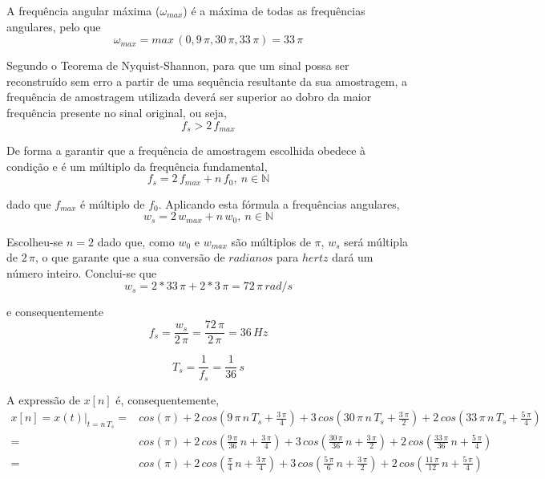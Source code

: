 \documentclass[a4paper]{article}
\begin{document}
\noindent A frequência angular máxima ($\omega_{max}$) é a máxima de todas as frequências angulares, pelo que
\begin{equation}
	\omega_{max} = max \, (0, 9 \, \pi, 30 \, \pi, 33 \, \pi) = 33 \, \pi
\end{equation}

\noindent Segundo o Teorema de Nyquist-Shannon, para que um sinal possa ser reconstruído sem erro a partir de uma sequência resultante da sua amostragem, a frequência de amostragem utilizada deverá ser superior ao dobro da maior frequência presente no sinal original, ou seja,
\begin{equation}
	f_s > 2 \, f_{max}
\end{equation}

\noindent De forma a garantir que a frequência de amostragem escolhida obedece à condição e é um múltiplo da frequência fundamental,
\begin{equation}
	f_s = 2 \, f_{max} + n \, f_0, ~ n \in \mathbb{N}
\end{equation}

\noindent dado que $f_{max}$ é múltiplo de $f_0$. Aplicando esta fórmula a frequências angulares,
\begin{equation}
	w_s = 2 \, w_{max} + n \, w_0, ~ n \in \mathbb{N}
\end{equation}

\noindent Escolheu-se $n = 2$ dado que, como $w_0$ e $w_{max}$ são múltiplos de $\pi$, $w_s$ será múltipla de $2 \, \pi$, o que garante que a sua conversão de $radianos$ para $hertz$ dará um número inteiro. Conclui-se que
\begin{equation}
	w_s = 2 * 33 \, \pi + 2 * 3 \, \pi = 72 \, \pi \, rad/s
\end{equation}

\noindent e consequentemente
\begin{equation}
	f_s = \frac{w_s}{2 \, \pi} = \frac{72 \, \pi}{2 \, \pi} = 36 \, Hz
\end{equation}

\begin{equation}
	T_s = \frac{1}{f_s} = \frac{1}{36} \, s
\end{equation}

\noindent A expressão de $x[n]$ é, consequentemente,
\begin{eqnarray}
	x[n] = x(t)|_{t = n \, T_s} = & cos(\pi) + 2 \, cos\left( 9 \, \pi \, n \, T_s + \frac{3 \, \pi}{4} \right) + 3 \, cos\left( 30 \, \pi \, n \, T_s + \frac{3 \, \pi}{2} \right) + 2 \, cos\left( 33 \, \pi \, n \, T_s + \frac{5 \, \pi}{4} \right) \\
	= & cos(\pi) + 2 \, cos\left( \frac{9 \, \pi}{36} \, n + \frac{3 \, \pi}{4} \right) + 3 \, cos\left( \frac{30 \, \pi}{36} \, n + \frac{3 \, \pi}{2} \right) + 2 \, cos\left( \frac{33 \, \pi}{36} \, n + \frac{5 \, \pi}{4} \right) \\
	= & cos(\pi) + 2 \, cos\left( \frac{\pi}{4} \, n + \frac{3 \, \pi}{4} \right) + 3 \, cos\left( \frac{5 \, \pi}{6} \, n + \frac{3 \, \pi}{2} \right) + 2 \, cos\left( \frac{11 \, \pi}{12} \, n + \frac{5 \, \pi}{4} \right)
\end{eqnarray}
\end{document}
